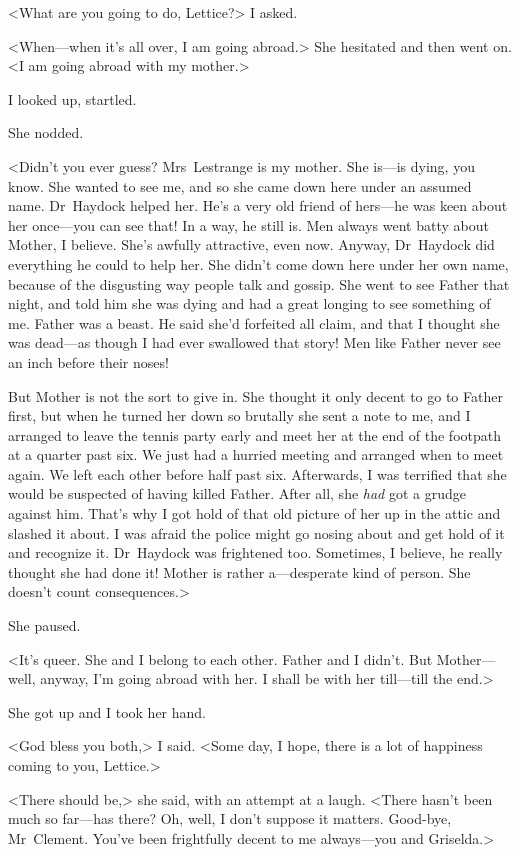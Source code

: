 <What are you going to do, Lettice?> I asked.

<When—when it's all over, I am going abroad.> She hesitated and then went on. <I am going abroad with my mother.>

I looked up, startled.

She nodded.

<Didn't you ever guess? Mrs~Lestrange is my mother. She is—is dying, you know. She wanted to see me, and so she came down here under an assumed name. Dr~Haydock helped her. He's a very old friend of hers—he was keen about her once—you can see that! In a way, he still is. Men always went batty about Mother, I believe. She's awfully attractive, even now. Anyway, Dr~Haydock did everything he could to help her. She didn't come down here under her own name, because of the disgusting way people talk and gossip. She went to see Father that night, and told him she was dying and had a great longing to see something of me. Father was a beast. He said she'd forfeited all claim, and that I thought she was dead—as though I had ever swallowed that story! Men like Father never see an inch before their noses!

But Mother is not the sort to give in. She thought it only decent to go to Father first, but when he turned her down so brutally she sent a note to me, and I arranged to leave the tennis party early and meet her at the end of the footpath at a quarter past six. We just had a hurried meeting and arranged when to meet again. We left each other before half past six. Afterwards, I was terrified that she would be suspected of having killed Father. After all, she \emph{had} got a grudge against him. That's why I got hold of that old picture of her up in the attic and slashed it about. I was afraid the police might go nosing about and get hold of it and recognize it. Dr~Haydock was frightened too. Sometimes, I believe, he really thought she had done it! Mother is rather a—desperate kind of person. She doesn't count consequences.>

She paused.

<It's queer. She and I belong to each other. Father and I didn't. But Mother—well, anyway, I'm going abroad with her. I shall be with her till—till the end.>

She got up and I took her hand.

<God bless you both,> I said. <Some day, I hope, there is a lot of happiness coming to you, Lettice.>

<There should be,> she said, with an attempt at a laugh. <There hasn't been much so far—has there? Oh, well, I don't suppose it matters. Good-bye, Mr~Clement. You've been frightfully decent to me always—you and Griselda.>

